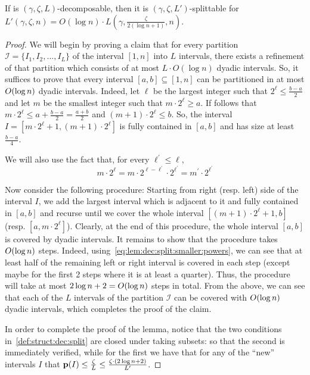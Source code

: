 \begin{lemma}\label{lemma:decomposable:splittable}
If \class is $(\gamma,\zeta,L)$-decomposable, then it is $(\gamma, \zeta, L')$-splittable for $L'(\gamma,\zeta,n) = O(\log n)\cdot L(\gamma,\frac{\zeta}{2(\log n+1)},n)$.
\end{lemma}
\begin{proof}
We will begin by proving a claim that for every partition $\mathcal{I}=\{I_1,I_2,...,I_L\}$ of the interval $[1,n]$ into $L$ intervals, there exists a refinement of that partition which consists of at most $L\cdot O(\log n)$ dyadic intervals. So, it suffices to prove that every interval $[a,b]\subseteq [1,n]$ can be partitioned in at most $\bigO{\log n}$ dyadic intervals. Indeed, let $\ell$ be the largest integer such that $2^\ell\leq \frac{b-a}{2}$ and let $m$ be the smallest integer such that $m\cdot 2^\ell\geq a$. If follows that $m\cdot 2^\ell\leq a+\frac{b-a}{2}=\frac{a+b}{2}$ and $(m+1)\cdot 2^\ell\leq b$. So, the interval $I=[m\cdot 2^\ell+1,(m+1)\cdot 2^\ell]$ is fully contained in $[a,b]$ and has size at least $\frac{b-a}{4}$. 

We will also use the fact that, for every $\ell^\prime\leq \ell$,
\begin{equation}\label{eq:lem:dec:split:smaller:powers}
m\cdot 2^\ell=m\cdot 2^{\ell-\ell^\prime}\cdot 2^{\ell^\prime}=m^\prime \cdot 2^{\ell^\prime}
\end{equation} 

Now consider the following procedure: Starting from right (resp. left) side of the interval $I$, we add the largest interval which is adjacent to it and fully contained in $[a,b]$ and recurse until we cover the whole interval $[(m+1)\cdot 2^\ell+1,b]$ (resp. $[a,m\cdot 2^\ell]$). Clearly, at the end of this procedure, the whole interval $[a,b]$ is covered by dyadic intervals. It remains to show that the procedure takes $\bigO{\log n}$ steps. Indeed, using~\cref{eq:lem:dec:split:smaller:powers}, we can see that at least half of the remaining left or right interval is covered in each step (except maybe for the first 2 steps where it is at least a quarter). Thus, the procedure will take at most $2\log n +2=\bigO{\log n}$ steps in total. From the above, we can see that each of the $L$ intervals of the partition $\mathcal{I}$ can be covered with $\bigO{\log n}$ dyadic intervals, which completes the proof of the claim. 

In order to complete the proof of the lemma, notice that the two conditions in~\cref{def:struct:dec:split} are closed under taking subsets: so that the second is immediately verified, while for the first we have that for any of the ``new'' intervals $I$ that $\mathbf{p}(I) \leq  \frac{\zeta}{L} \leq \frac{\zeta\cdot (2\log n+2)}{L'}$. 
\end{proof}

